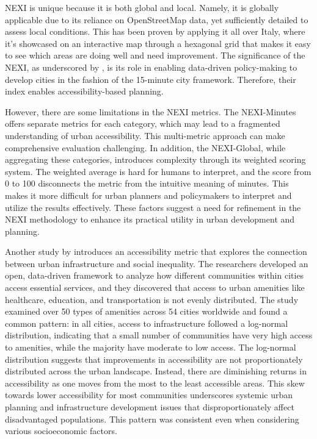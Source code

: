 NEXI is unique because it is both global and local. 
Namely, it is globally applicable due to its reliance on OpenStreetMap data, yet sufficiently detailed to assess local conditions.
This has been proven by applying it all over Italy, where it's showcased on an interactive map through a hexagonal grid that makes it easy to see which areas are doing well and need improvement.
The significance of the NEXI, as underscored by , is its role in enabling data-driven policy-making to develop cities in the fashion of the 15-minute city framework. 
Therefore, their index enables accessibility-based planning.

However, there are some limitations in the NEXI metrics. 
The NEXI-Minutes offers separate metrics for each category, which may lead to a fragmented understanding of urban accessibility. 
This multi-metric approach can make comprehensive evaluation challenging. 
In addition, the NEXI-Global, while aggregating these categories, introduces complexity through its weighted scoring system. 
The weighted average is hard for humans to interpret, and the score from 0 to 100 disconnects the metric from the intuitive meaning of minutes.
This makes it more difficult for urban planners and policymakers to interpret and utilize the results effectively. 
These factors suggest a need for refinement in the NEXI methodology to enhance its practical utility in urban development and planning.


Another study by  introduces an accessibility metric that explores the connection between urban infrastructure and social inequality. 
The researchers developed an open, data-driven framework to analyze how different communities within cities access essential services, and they discovered that access to urban amenities like healthcare, education, and transportation is not evenly distributed. 
The study examined over 50 types of amenities across 54 cities worldwide and found a common pattern: in all cities, access to infrastructure followed a log-normal distribution, indicating that a small number of communities have very high access to amenities, while the majority have moderate to low access. 
The log-normal distribution suggests that improvements in accessibility are not proportionately distributed across the urban landscape. 
Instead, there are diminishing returns in accessibility as one moves from the most to the least accessible areas. 
This skew towards lower accessibility for most communities underscores systemic urban planning and infrastructure development issues that disproportionately affect disadvantaged populations.
This pattern was consistent even when considering various socioeconomic factors.


